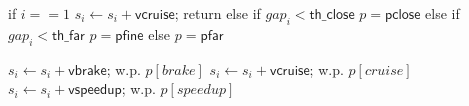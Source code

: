 if $i == 1$
		$s_i \gets s_i + \mathsf{vcruise}$;
		return
else
    if $\mathit{gap}_i < \mathsf{th\_close}$
		    $\mathit{p} = \mathsf{pclose}$
    else if $\mathit{gap}_i < \mathsf{th\_far}$
		    $\mathit{p} = \mathsf{pfine}$
    else
		    $\mathit{p} = \mathsf{pfar}$

$s_i \gets s_i + \mathsf{vbrake}$; w.p. $\mathit{p}[brake]$
$s_i \gets s_i + \mathsf{vcruise}$; w.p. $\mathit{p}[cruise]$
$s_i \gets s_i + \mathsf{vspeedup}$; w.p. $\mathit{p}[speedup]$
